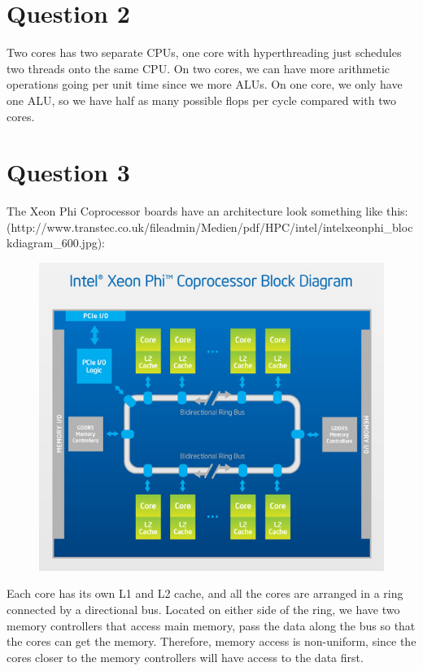 \documentclass[11pt]{article}
\begin{document}
    \section*{Question 2}
        Two cores has two separate CPUs, one core with hyperthreading just schedules two threads onto the same CPU. On two cores, we can have more arithmetic operations going per unit time since we more ALUs. On one core, we only have one ALU, so we have half as many possible flops per cycle compared with two cores.

    \section*{Question 3}
        The Xeon Phi Coprocessor boards have an architecture look something like this: \\
        (http://www.transtec.co.uk/fileadmin/Medien/pdf/HPC/intel/intelxeonphi\_blockdiagram\_600.jpg):
        \begin{figure}[H]
            \centering
            \includegraphics[width=5in]{q3.jpg}
        \end{figure}

        Each core has its own L1 and L2 cache, and all the cores are arranged in a ring connected by a directional bus. Located on either side of the ring, we have two memory controllers that access main memory, pass the data along the bus so that the cores can get the memory. Therefore, memory access is non-uniform, since the cores closer to the memory controllers will have access to the data first.
\end{document}
